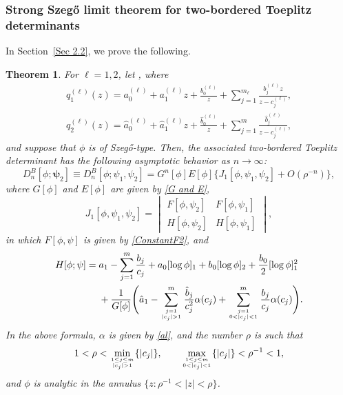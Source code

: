 \documentclass[10pt,a4paper]{amsart}
\numberwithin{equation}{section}
\newtheorem{Theorem}{Theorem}[section]
\newcommand{\al}{\alpha}
\begin{document}
\subsubsection[Strong Szeg\H{o} limit theorem for two-bordered Toeplitz determinants]{Strong Szeg\H{o} limit theorem for two-bordered Toeplitz determinants}
	
	In Section~\ref{Sec 2.2}, we prove the following.
	

	\begin{Theorem}\label{main thm 2-bordered}
		For $\ell=1,2$,	let , where
		\begin{gather*}%
			q^{(\ell)}_1(z) = a^{(\ell)}_0+a^{(\ell)}_1z+\frac{b^{(\ell)}_0}{z}+\sum^{m_{\ell}}_{j=1}\frac{b^{(\ell)}_j z}{z-c^{(\ell)}_j}, \\
 q^{(\ell)}_2(z) = \hat{a}^{(\ell)}_0+\hat{a}^{(\ell)}_1z+\frac{\hat{b}^{(\ell)}_0}{z}+
			\sum_{j=1}^m \frac{\hat{b}^{(\ell)}_j}{z-c^{(\ell)}_j},
		\end{gather*}
		and suppose that $\phi$ is of Szeg\H{o}-type. Then, the associated two-bordered Toeplitz determinant has the following asymptotic behavior as $n \to \infty$:
		\begin{equation}\label{135}
			D^B_n[\phi;\boldsymbol{\psi}_2] \equiv D^B_n[\phi;\psi_1,\psi_2] = G^n[\phi] E[\phi] \{ J_1[\phi,\psi_1,\psi_2] + O(\rho^{-n}) \},
		\end{equation}
		where $G[\phi]$ and $E[\phi]$ are given by \eqref{G and E},
		\begin{equation}\label{136}
			J_1[\phi,\psi_1,\psi_2] = \begin{vmatrix}
				F[\phi,\psi_2] & F[\phi,\psi_1] \\
				H[\phi,\psi_2] & H[\phi,\psi_1]
			\end{vmatrix},
		\end{equation}
		in which $F[\phi,\psi]$ is given by \eqref{ConstantF2}, and
		\begin{align*}%
				H[\phi;\psi] =	{}&
				a_1 - \sum_{j=1}^{m} \frac{b_j}{c_j}+ a_0 [\log \phi]_{1} + b_0 [\log \phi]_{2} + \frac{b_0}{2} [\log \phi]_{1}^2
				\\ & +	
				\frac{1}{G[\phi]}\Bigg(
				\hat{a}_1-
				\sum^{m}_{j=1 \atop |c_j|>1 }\frac{\hat{b}_j}{c^2_j} \al(c_j) + 		\sum^m_{j=1 \atop 0<|c_j|<1} \frac{b_j}{c_j} \al(c_j) \Bigg).
		\end{align*}
		In the above formula,
		$\al$ is given by \eqref{al}, and the number $\rho$ is such that
\[
1<\rho < \underset{1 \leq j \leq m \atop |c_j|>1}{\min} \{|c_j|\}, \qquad \underset{1 \leq j \leq m \atop 0<|c_j|<1}{\max} \{|c_j|\}<\rho^{-1}<1,
\]
 and $\phi$ is analytic in the annulus $\big\{z\colon \rho^{-1}<|z|<\rho\big\}$.
	\end{Theorem}
\end{document}
